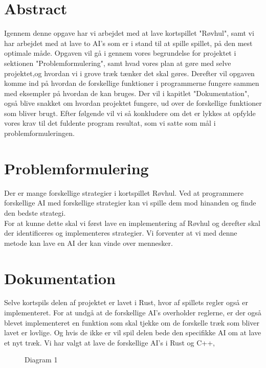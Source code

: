 \documentclass[a4paper, 12pt]{article}
\begin{document}
\section{Abstract}

Igennem denne opgave har vi arbejdet med at lave kortspillet "Røvhul", samt vi har arbejdet med at lave to AI's som er i stand til at spille spillet, på den mest optimale måde. Opgaven vil gå i gennem vores begrundelse for projektet i sektionen "Problemformulering", samt hvad vores plan at gøre med selve projektet,og hvordan vi i grove træk tænker det skal gøres.
\bigbreak
Derefter vil opgaven komme ind på hvordan de forskellige funktioner i programmerne fungere sammen med eksempler på hvordan de kan bruges. Der vil i kapitlet "Dokumentation", også blive snakket om hvordan projektet fungere, ud over de forskellige funktioner som bliver brugt. Efter følgende vil vi så konkludere om det er lykkes at opfylde vores krav til det fuldente program resultat, som vi satte som mål i problemformuleringen.

\section{Problemformulering}

Der er mange forskellige strategier i kortspillet Røvhul. Ved at programmere forskellige AI med forskellige strategier kan vi spille dem mod hinanden og finde den bedste strategi.
\\
For at kunne dette skal vi først lave en implementering af Røvhul og derefter skal der identificeres og implementeres strategier. Vi forventer at vi med denne metode kan lave en AI der kan vinde over mennesker.

\vfill
\pagebreak

\section{Dokumentation}
Selve kortspils delen af projektet er lavet i Rust, hvor af spillets regler også er implementeret. For at undgå at de forskellige AI's overholder reglerne, er der også blevet implementeret en funktion som skal tjekke om de forskelle træk som bliver lavet er lovlige. Og hvis de ikke er vil spil delen bede den specifikke AI om at lave et nyt træk.
Vi har valgt at lave de forskellige AI's i Rust og C++,

\begin{figure}[H]
	\centering
	
	\caption{Diagram 1}
\end{figure}
\end{document}
